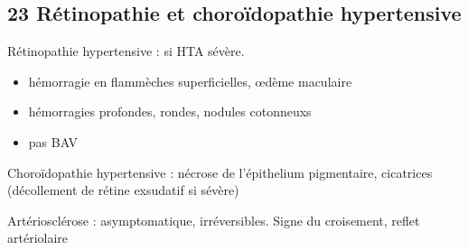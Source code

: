 \documentclass[11pt]{article}
\begin{document}
\subsection{23 Rétinopathie et choroïdopathie hypertensive}
\label{sec:org136b1b2}
Rétinopathie hypertensive : si HTA sévère.
\begin{itemize}
\item hémorragie en flammèches superficielles, \oe{}dème maculaire
\item hémorragies profondes, rondes, nodules cotonneuxs
\item pas BAV
\end{itemize}
Choroïdopathie hypertensive : nécrose de l'épithelium pigmentaire, cicatrices
(décollement de rétine exsudatif si sévère)

Artériosclérose : asymptomatique, irréversibles. Signe du croisement, \inc reflet artériolaire
\end{document}
